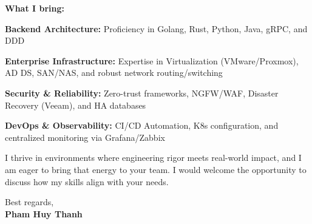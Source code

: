 \documentclass[10pt, letterpaper]{article}
\begin{document}
\begin{onecolentry}
\textbf{What I bring:}

\vspace{0.1cm}

\begin{highlights}
    \item \textbf{Backend Architecture:} Proficiency in Golang, Rust, Python, Java, gRPC, and DDD
    \item \textbf{Enterprise Infrastructure:} Expertise in Virtualization (VMware/Proxmox), AD DS, SAN/NAS, and robust network routing/switching
    \item \textbf{Security \& Reliability:} Zero-trust frameworks, NGFW/WAF, Disaster Recovery (Veeam), and HA databases
    \item \textbf{DevOps \& Observability:} CI/CD Automation, K8s configuration, and centralized monitoring via Grafana/Zabbix
\end{highlights}

\vspace{0.2cm}

I thrive in environments where engineering rigor meets real-world impact, and I am eager to bring that energy to your team. I would welcome the opportunity to discuss how my skills align with your needs.

\vspace{0.4cm}

Best regards,\\
\textbf{Pham Huy Thanh}

\end{onecolentry}
\end{document}
